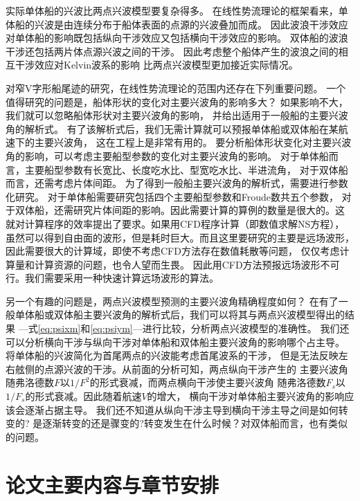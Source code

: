 实际单体船的兴波比两点兴波模型要复杂得多。
在线性势流理论的框架看来，单体船的兴波是由连续分布于船体表面的点源的兴波叠加而成。
因此波浪干涉效应对单体船的影响既包括纵向干涉效应又包括横向干涉效应的影响。
双体船的波浪干涉还包括两片体点源兴波之间的干涉。
因此考虑整个船体产生的波浪之间的相互干涉效应对Kelvin波系的影响
比两点兴波模型更加接近实际情况。

对窄V字形船尾迹的研究，在线性势流理论的范围内还存在下列重要问题。
一个值得研究的问题是，船体形状的变化对主要兴波角的影响多大？
如果影响不大，我们就可以忽略船体形状对主要兴波角的影响，
并给出适用于一般船的主要兴波角的解析式。
有了该解析式后，我们无需计算就可以预报单体船或双体船在某航速下的主要兴波角，
这在工程上是非常有用的。
要分析船体形状变化对主要兴波角的影响，可以考虑主要船型参数的变化对主要兴波角的影响。
对于单体船而言，主要船型参数有长宽比、长度吃水比、型宽吃水比、半进流角，
对于双体船而言，还需考虑片体间距。
为了得到一般船主要兴波角的解析式，需要进行参数化研究。
对于单体船需要研究包括四个主要船型参数和Froude数共五个参数，
对于双体船，还需研究片体间距的影响。因此需要计算的算例的数量是很大的。这
就对计算程序的效率提出了要求。如果用CFD程序计算（即数值求解NS方程），
虽然可以得到自由面的波形，但是耗时巨大。而且这里要研究的主要是远场波形，
因此需要很大的计算域，即使不考虑CFD方法存在数值耗散等问题，
仅仅考虑计算量和计算资源的问题，也令人望而生畏。
因此用CFD方法预报远场波形不可行。我们需要采用一种快速计算远场波形的算法。

另一个有趣的问题是，两点兴波模型预测的主要兴波角精确程度如何？
在有了一般单体船或双体船主要兴波角的解析式后，我们可以将其与两点兴波模型得出的结果
---式\eqref{eq:psixm}和\eqref{eq:psiym}---进行比较，分析两点兴波模型的准确性。
我们还可以分析横向干涉与纵向干涉对单体船和双体船主要兴波角的影响哪个占主导。
将单体船的兴波简化为首尾两点的兴波能考虑首尾波系的干涉，
但是无法反映左右舷侧的点源兴波的干涉。从前面的分析可知，两点纵向干涉产生的
主要兴波角随弗洛德数$F$以$1/F^2$的形式衰减，而两点横向干涉使主要兴波角
随弗洛德数$F_s$以$1/F_s$的形式衰减。因此随着航速$V$的增大，
横向干涉对单体船主要兴波角的影响应该会逐渐占据主导。
我们还不知道从纵向干涉主导到横向干涉主导之间是如何转变的?
是逐渐转变的还是骤变的?转变发生在什么时候？对双体船而言，也有类似的问题。


\section{论文主要内容与章节安排}
\label{sec:plan}



